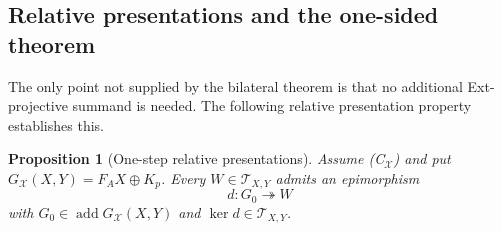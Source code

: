 \documentclass[11pt,reqno]{amsart}
\newtheorem{proposition}[theorem]{Proposition}
\theoremstyle{definition}
\theoremstyle{remark}
\newcommand{\addc}{\operatorname{add}}
\numberwithin{equation}{section}
\begin{document}
\subsection{Relative presentations and the one-sided theorem}

The only point not supplied by the bilateral theorem is that no additional
Ext-projective summand is needed.  The following relative presentation
property establishes this.

\begin{proposition}[One-step relative presentations]
\label{prop:one-step-relative-presentations}
Assume \textup{(C$_{\mathcal X}$)} and put
$G_{\mathcal X}(X,Y)=F_AX\oplus K_p$.  Every
$W\in\mathcal T_{X,Y}$ admits an epimorphism
\[
 d:G_0\twoheadrightarrow W
\]
with $G_0\in\addc G_{\mathcal X}(X,Y)$ and
$\ker d\in\mathcal T_{X,Y}$.
\end{proposition}
\end{document}

